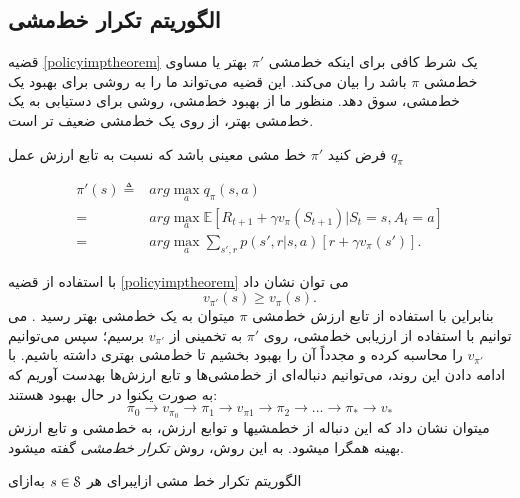 \subsection{الگوریتم تکرار خط‌مشی}
قضیه \ref{policyimptheorem} یک شرط کافی برای اینکه خط‌مشی $\pi'$ بهتر یا مساوی خط‌مشی $\pi$ باشد را بیان می‌کند. این قضیه می‌تواند ما را به روشی برای بهبود یک خط‌مشی، سوق دهد. منظور ما از بهبود خط‌مشی، روشی برای دستیابی به یک خط‌مشی بهتر، از روی یک خط‌مشی ضعیف تر است.

فرض کنید $\pi'$ خط مشی معینی باشد که نسبت به تابع ارزش عمل 
$q_\pi$
	
\begin{align*}
\pi'(s) \triangleq& arg\max_{a} q_\pi(s,a) \\
= & arg\max_{a} \mathbb{E}\left[R_{t+1} + \gamma v_\pi(S_{t+1}) | S_t = s, A_t = a\right] \\
= & arg \max_{a} \sum_{s',r} p(s',r|s,a) \left[r + \gamma v_\pi(s')\right].\end{align*}

با استفاده از قضیه \ref{policyimptheorem} می توان نشان داد
 $$v_{\pi'}(s) \ge v_{\pi}(s).$$
بنابراین با استفاده از تابع ارزش خط‌مشی $\pi$ می\nf توان به یک خط‌مشی بهتر رسید \cite{suttonbook}. می توانیم با استفاده از ارزیابی خط‌مشی، روی $\pi'$ به تخمینی از $v_{\pi'}$ برسیم؛ سپس می‌توانیم
$v_{\pi'}$
    را محاسبه کرده و مجدداً آن را بهبود بخشیم تا خط‌مشی بهتری داشته باشیم. با ادامه دادن این روند، می‌توانیم دنباله‌ای از خط‌مشی‌ها و تابع ارزش‌ها بهدست آوریم که به صورت یکنوا در حال بهبود هستند:
$$\pi_0 \longrightarrow v_{\pi_0} \longrightarrow \pi_1 \longrightarrow v_{\pi{1}} \longrightarrow \pi_2 \longrightarrow \dots \longrightarrow \pi_* \longrightarrow v_*$$
می\nf توان نشان داد که این دنباله از خط\nf مشی\nf ها و توابع ارزش، به خط‌مشی و تابع ارزش بهینه همگرا می\nf شود.
به این روش، روش \textit{تکرار خط‌مشی}  
گفته می\nf شود.

{الگوریتم تکرار خط مشی}
‌ازای{برای هر $s \in \EuScript{S}$}
‌به‌ازای


